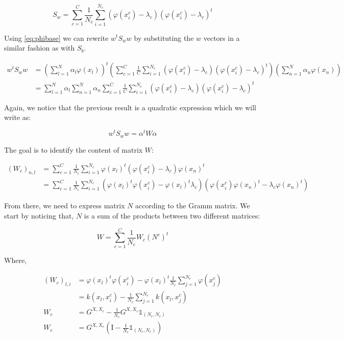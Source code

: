 \begin{equation*}
S_w = \sum_{c = 1}^C \frac{1}{N_c} \sum_{i = 1}^{N_c} (\varphi(x_i^c) - \lambda_c)(\varphi(x_i^c) -
\lambda_c)^t
\end{equation*}

Using \ref{eq:phibase} we can rewrite $w^tS_ww$ by substituting the $w$ vectors in a similar fashion as
with $S_b$.

\begin{align*}
  w^tS_ww &= \left( \sum_{l=1}^N \alpha_l \varphi(x_l)\right)^t
             \left( \sum_{c=1}^C \frac{1}{C}
                       \sum_{i=1}^{N_c} (\varphi(x_i^c) - \lambda_c)
                                        (\varphi(x_i^c) - \lambda_c)^t\right)
             \left( \sum_{n=1}^N \alpha_n \varphi(x_n)\right)\\
          &= \sum_{l=1}^N \alpha_l \sum_{n=1}^N \alpha_n \sum_{c=1}^C \frac{1}{C}
                \sum_{i=1}^{N_c} (\varphi(x_i^c) - \lambda_c)
                                 (\varphi(x_i^c) - \lambda_c)^t
\end{align*}

Again, we notice that the previous result is a quadratic expression which we will write as:

\begin{equation*}
w^tS_ww = \alpha^tW\alpha
\end{equation*}

The goal is to identify the content of matrix $W$:

\begin{align*}
  (W_c)_{n,l} &= \sum_{c=1}^C \frac{1}{N_c} \sum_{i=1}^{N_c}
                  \varphi(x_l)^t(\varphi(x_i^c) - \lambda_c)\varphi(x_n)^t \\
            &= \sum_{c=1}^C \frac{1}{N_c} \sum_{i=1}^{N_c} (\varphi(x_l)^t\varphi(x_i^c) -
            \varphi(x_l)^t\lambda_c) (\varphi(x_i^c)\varphi(x_n)^t -
            \lambda_c \varphi(x_n)^t)
\end{align*}

From there, we need to express matrix $N$ according to the Gramm matrix. We start by noticing that,
$N$ is a sum of the products between two different matrices:

\begin{equation*}
W = \sum_{c=1}^C \frac{1}{N_c} W_c (N^c)^t
\end{equation*}

Where,

\begin{align*}
  (W_c)_{l, i} &= \varphi(x_l)^t\varphi(x_i^c) - \varphi(x_l)^t \frac{1}{N_c}\sum_{j=1}^{N_c}\varphi(x_j^c) \\
             &= k(x_l, x_i^c) - \frac{1}{N_c}\sum_{j=1}^{N_c}k(x_l, x_j^c) \\
   W_c       &= G^{X, X_c} - \frac{1}{N_c} G^{X, X_c} \mathds{1}_{(N_c, N_c)} \\
   W_c       &= G^{X, X_c} \left(\textrm{I} - \frac{1}{N_c}\mathds{1}_{(N_c, N_c)}\right)
\end{align*}

